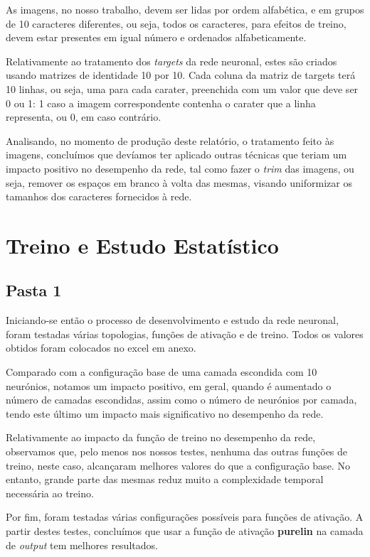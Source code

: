 \documentclass[11pt]{article}
\begin{document}
	As imagens, no nosso trabalho, devem ser lidas por ordem alfabética, e em grupos de 10 caracteres diferentes, ou seja, todos os caracteres, para efeitos de treino, devem estar presentes em igual número e ordenados alfabeticamente.
	
	Relativamente ao tratamento dos \textit{targets} da rede neuronal, estes são criados usando matrizes de identidade 10 por 10. Cada coluna da matriz de targets terá 10 linhas, ou seja, uma para cada carater, preenchida com um valor que deve ser 0 ou 1: 1 caso a imagem correspondente contenha o carater que a linha representa, ou 0, em caso contrário.
	
	Analisando, no momento de produção deste relatório, o tratamento feito às imagens, concluímos que devíamos ter aplicado outras técnicas que teriam um impacto positivo no desempenho da rede, tal como fazer o \textit{trim} das imagens, ou seja, remover os espaços em branco à volta das mesmas, visando uniformizar os tamanhos dos caracteres fornecidos à rede.
	
	\large
	\section{Treino e Estudo Estatístico}
	\subsection{Pasta 1}
	\normalsize
	
	Iniciando-se então o processo de desenvolvimento e estudo da rede neuronal, foram testadas várias topologias, funções de ativação e de treino. Todos os valores obtidos foram colocados no excel em anexo.
	
	Comparado com a configuração base de uma camada escondida com 10 neurónios, notamos um impacto positivo, em geral, quando é aumentado o número de camadas escondidas, assim como o número de neurónios por camada, tendo este último um impacto mais significativo no desempenho da rede.
	
	Relativamente ao impacto da função de treino no desempenho da rede, observamos que, pelo menos nos nossos testes, nenhuma das outras funções de treino, neste caso, alcançaram melhores valores do que a configuração base. No entanto, grande parte das mesmas reduz muito a complexidade temporal necessária ao treino.
	
	Por fim, foram testadas várias configurações possíveis para funções de ativação. A partir destes testes, concluímos que usar a função de ativação \textbf{purelin} na camada de \textit{output} tem melhores resultados.
	
\end{document}
